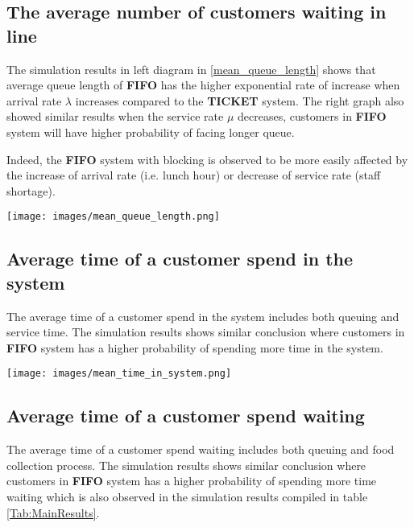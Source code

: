 \subsection{The average number of customers waiting in line}

The simulation results in left diagram in \ref{mean_queue_length} shows that average queue length of \textbf{FIFO} has the higher exponential rate of increase when arrival rate $\lambda$ increases compared to the \textbf{TICKET} system. The right graph also showed similar results when the service rate $\mu$ decreases, customers in \textbf{FIFO} system will have higher probability of facing longer queue. 

Indeed, the \textbf{FIFO} system with blocking is observed to be more easily affected by the increase of arrival rate (i.e. lunch hour) or decrease of service rate (staff shortage).

\noindent
\begin{minipage}{\textwidth}
    \texttt{[image: images/mean\_queue\_length.png]}
    \label{mean_queue_length}
\end{minipage}



\subsection{Average time of a customer spend in the system}

The average time of a customer spend in the system includes both queuing and service time. The simulation results shows similar conclusion where customers in  \textbf{FIFO} system has a higher probability of spending more time in the system.

\noindent
\begin{minipage}{\textwidth}
    \texttt{[image: images/mean\_time\_in\_system.png]}
    \label{bar}
\end{minipage}
\subsection{Average time of a customer spend waiting}

The average time of a customer spend waiting includes both queuing and food collection process. The simulation results shows similar conclusion where customers in  \textbf{FIFO} system has a higher probability of spending more time waiting which is also observed in the simulation results compiled in table \ref{Tab:MainResults}.

